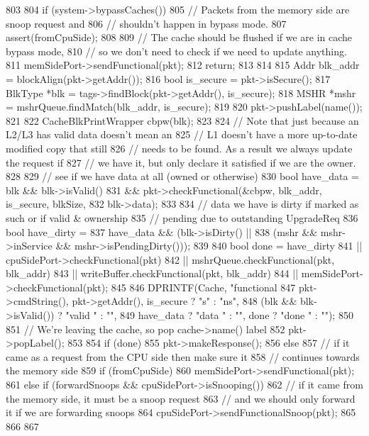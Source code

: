 \begin{DoxyCode}
803 {
804     if (system->bypassCaches()) {
805         // Packets from the memory side are snoop request and
806         // shouldn't happen in bypass mode.
807         assert(fromCpuSide);
808 
809         // The cache should be flushed if we are in cache bypass mode,
810         // so we don't need to check if we need to update anything.
811         memSidePort->sendFunctional(pkt);
812         return;
813     }
814 
815     Addr blk_addr = blockAlign(pkt->getAddr());
816     bool is_secure = pkt->isSecure();
817     BlkType *blk = tags->findBlock(pkt->getAddr(), is_secure);
818     MSHR *mshr = mshrQueue.findMatch(blk_addr, is_secure);
819 
820     pkt->pushLabel(name());
821 
822     CacheBlkPrintWrapper cbpw(blk);
823 
824     // Note that just because an L2/L3 has valid data doesn't mean an
825     // L1 doesn't have a more up-to-date modified copy that still
826     // needs to be found.  As a result we always update the request if
827     // we have it, but only declare it satisfied if we are the owner.
828 
829     // see if we have data at all (owned or otherwise)
830     bool have_data = blk && blk->isValid()
831         && pkt->checkFunctional(&cbpw, blk_addr, is_secure, blkSize,
832                                 blk->data);
833 
834     // data we have is dirty if marked as such or if valid & ownership
835     // pending due to outstanding UpgradeReq
836     bool have_dirty =
837         have_data && (blk->isDirty() ||
838                       (mshr && mshr->inService && mshr->isPendingDirty()));
839 
840     bool done = have_dirty
841         || cpuSidePort->checkFunctional(pkt)
842         || mshrQueue.checkFunctional(pkt, blk_addr)
843         || writeBuffer.checkFunctional(pkt, blk_addr)
844         || memSidePort->checkFunctional(pkt);
845 
846     DPRINTF(Cache, "functional %
847             pkt->cmdString(), pkt->getAddr(), is_secure ? "s" : "ns",
848             (blk && blk->isValid()) ? "valid " : "",
849             have_data ? "data " : "", done ? "done " : "");
850 
851     // We're leaving the cache, so pop cache->name() label
852     pkt->popLabel();
853 
854     if (done) {
855         pkt->makeResponse();
856     } else {
857         // if it came as a request from the CPU side then make sure it
858         // continues towards the memory side
859         if (fromCpuSide) {
860             memSidePort->sendFunctional(pkt);
861         } else if (forwardSnoops && cpuSidePort->isSnooping()) {
862             // if it came from the memory side, it must be a snoop request
863             // and we should only forward it if we are forwarding snoops
864             cpuSidePort->sendFunctionalSnoop(pkt);
865         }
866     }
867 }
\end{DoxyCode}
